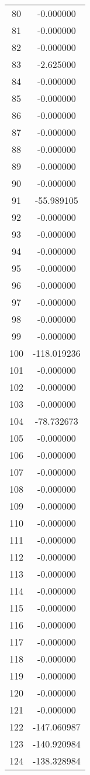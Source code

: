 \documentclass[12pt]{article}
\begin{document}
\begin{longtable}{@{}cc@{}}
80 & -0.000000 \\
81 & -0.000000 \\
82 & -0.000000 \\
83 & -2.625000 \\
84 & -0.000000 \\
85 & -0.000000 \\
86 & -0.000000 \\
87 & -0.000000 \\
88 & -0.000000 \\
89 & -0.000000 \\
90 & -0.000000 \\
91 & -55.989105 \\
92 & -0.000000 \\
93 & -0.000000 \\
94 & -0.000000 \\
95 & -0.000000 \\
96 & -0.000000 \\
97 & -0.000000 \\
98 & -0.000000 \\
99 & -0.000000 \\
100 & -118.019236 \\
101 & -0.000000 \\
102 & -0.000000 \\
103 & -0.000000 \\
104 & -78.732673 \\
105 & -0.000000 \\
106 & -0.000000 \\
107 & -0.000000 \\
108 & -0.000000 \\
109 & -0.000000 \\
110 & -0.000000 \\
111 & -0.000000 \\
112 & -0.000000 \\
113 & -0.000000 \\
114 & -0.000000 \\
115 & -0.000000 \\
116 & -0.000000 \\
117 & -0.000000 \\
118 & -0.000000 \\
119 & -0.000000 \\
120 & -0.000000 \\
121 & -0.000000 \\
122 & -147.060987 \\
123 & -140.920984 \\
124 & -138.328984 \\

\end{longtable}
\end{document}
